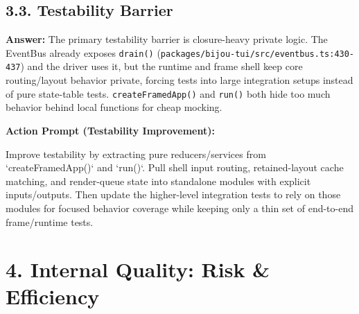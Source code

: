 \subsection{3.3. Testability Barrier}\label{record-416-testability-barrier}

\textbf{Answer:} The primary testability barrier is closure-heavy private logic. The EventBus already exposes \texttt{d\allowbreak{}r\allowbreak{}a\allowbreak{}i\allowbreak{}n\allowbreak{}(\allowbreak{})} (\texttt{p\allowbreak{}a\allowbreak{}c\allowbreak{}k\allowbreak{}a\allowbreak{}g\allowbreak{}e\allowbreak{}s\allowbreak{}/\allowbreak{}b\allowbreak{}i\allowbreak{}j\allowbreak{}o\allowbreak{}u\allowbreak{}-\allowbreak{}t\allowbreak{}u\allowbreak{}i\allowbreak{}/\allowbreak{}s\allowbreak{}r\allowbreak{}c\allowbreak{}/\allowbreak{}e\allowbreak{}v\allowbreak{}e\allowbreak{}n\allowbreak{}t\allowbreak{}b\allowbreak{}u\allowbreak{}s\allowbreak{}.\allowbreak{}t\allowbreak{}s\allowbreak{}:\allowbreak{}4\allowbreak{}3\allowbreak{}0\allowbreak{}-\allowbreak{}4\allowbreak{}3\allowbreak{}7}) and the driver uses it, but the runtime and frame shell keep core routing/layout behavior private, forcing tests into large integration setups instead of pure state-table tests. \texttt{c\allowbreak{}r\allowbreak{}e\allowbreak{}a\allowbreak{}t\allowbreak{}e\allowbreak{}F\allowbreak{}r\allowbreak{}a\allowbreak{}m\allowbreak{}e\allowbreak{}d\allowbreak{}A\allowbreak{}p\allowbreak{}p\allowbreak{}(\allowbreak{})} and \texttt{r\allowbreak{}u\allowbreak{}n\allowbreak{}(\allowbreak{})} both hide too much behavior behind local functions for cheap mocking.

\textbf{Action Prompt (Testability Improvement):}

\begin{CodeBlock}
Improve testability by extracting pure reducers/services from `createFramedApp()` and `run()`. Pull shell input routing, retained-layout cache matching, and render-queue state into standalone modules with explicit inputs/outputs. Then update the higher-level integration tests to rely on those modules for focused behavior coverage while keeping only a thin set of end-to-end frame/runtime tests.
\end{CodeBlock}

\section{4. Internal Quality: Risk \& Efficiency}\label{record-416-internal-quality-risk-efficiency}

